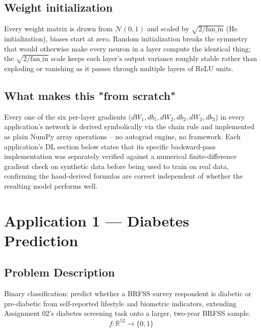\documentclass[11pt, a4paper]{article}
\begin{document}
\subsection{Weight initialization}

Every weight matrix is drawn from $\mathcal{N}(0,1)$ and scaled by $\sqrt{2/\text{fan\_in}}$
(He initialization), biases start at zero. Random initialization breaks the symmetry that
would otherwise make every neuron in a layer compute the identical thing; the
$\sqrt{2/\text{fan\_in}}$ scale keeps each layer's output variance roughly stable rather
than exploding or vanishing as it passes through multiple layers of ReLU units.

\subsection{What makes this "from scratch"}

Every one of the six per-layer gradients ($dW_1, db_1, dW_2, db_2, dW_3, db_3$) in every
application's network is derived symbolically via the chain rule and implemented as plain
NumPy array operations -- no autograd engine, no framework. Each application's DL section
below states that its specific backward-pass implementation was separately verified against
a numerical finite-difference gradient check on synthetic data before being used to train on
real data, confirming the hand-derived formulas are correct independent of whether the
resulting model performs well.

\section{Application 1 --- Diabetes Prediction}

\subsection{Problem Description}
Binary classification: predict whether a BRFSS survey respondent is diabetic or
pre-diabetic from self-reported lifestyle and biometric indicators, extending Assignment
02's diabetes screening task onto a larger, two-year BRFSS sample.
\[
f: \mathbb{R}^{52} \longrightarrow \{0, 1\}
\]
\end{document}
